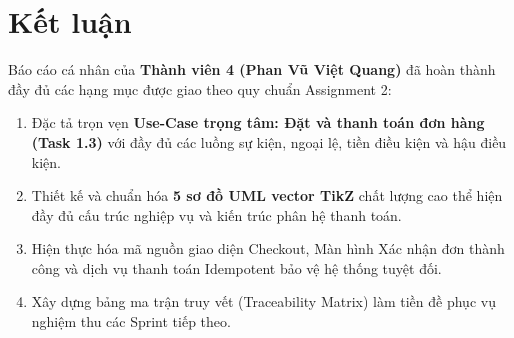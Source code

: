 \documentclass[a4paper]{article}
\begin{document}
\section{Kết luận}
Báo cáo cá nhân của \textbf{Thành viên 4 (Phan Vũ Việt Quang)} đã hoàn thành đầy đủ các hạng mục được giao theo quy chuẩn Assignment 2:
\begin{enumerate}
    \item Đặc tả trọn vẹn \textbf{Use-Case trọng tâm: Đặt và thanh toán đơn hàng (Task 1.3)} với đầy đủ các luồng sự kiện, ngoại lệ, tiền điều kiện và hậu điều kiện.
    \item Thiết kế và chuẩn hóa \textbf{5 sơ đồ UML vector TikZ} chất lượng cao thể hiện đầy đủ cấu trúc nghiệp vụ và kiến trúc phân hệ thanh toán.
    \item Hiện thực hóa mã nguồn giao diện Checkout, Màn hình Xác nhận đơn thành công và dịch vụ thanh toán Idempotent bảo vệ hệ thống tuyệt đối.
    \item Xây dựng bảng ma trận truy vết (Traceability Matrix) làm tiền đề phục vụ nghiệm thu các Sprint tiếp theo.
\end{enumerate}
\end{document}
